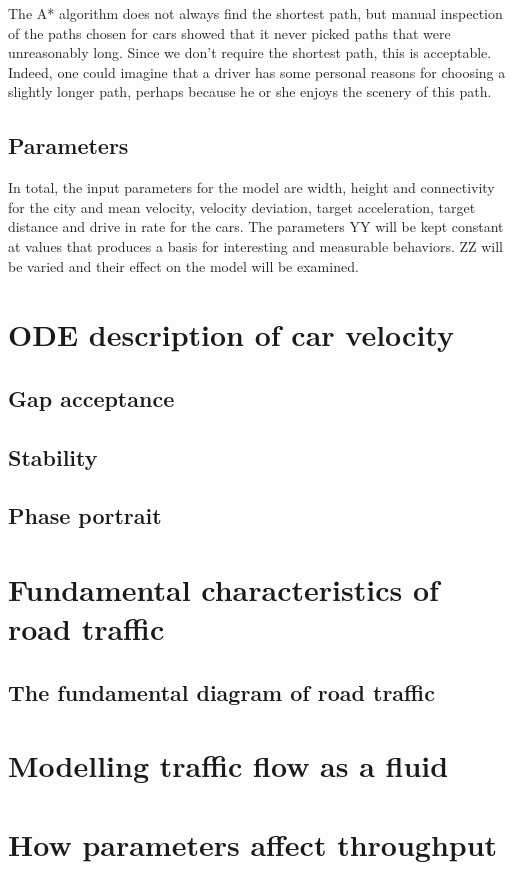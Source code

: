 \documentclass[11pt,a4paper]{article}
\begin{document}
The A* algorithm does not always find the shortest path, but manual inspection
of the paths chosen for cars showed that it never picked paths that were
unreasonably long. Since we don't require the shortest path, this is acceptable.
Indeed, one could imagine that a driver has some personal reasons for choosing
a slightly longer path, perhaps because he or she enjoys the scenery of this
path.

\subsection{Parameters}
In total, the input parameters for the model are width, height and connectivity for the city and mean velocity, velocity deviation, target acceleration, target distance and drive in rate for the cars. The parameters YY will be kept constant at values that produces a basis for interesting and measurable behaviors. ZZ will be varied and their effect on the model will be examined.

\section{ODE description of car velocity}
\subsection{Gap acceptance}
\subsection{Stability}
\subsection{Phase portrait}

\section{Fundamental characteristics of road traffic}
\subsection{The fundamental diagram of road traffic}

\section{Modelling traffic flow as a fluid}

\section{How parameters affect throughput}
\end{document}
